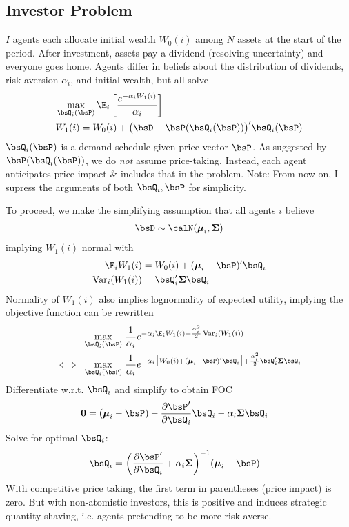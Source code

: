 \documentclass[12pt]{article}
\theoremstyle{plain}
\theoremstyle{definition}
\theoremstyle{remark}
\newcommand{\bsmu}{\boldsymbol{\mu}}
\newcommand{\bsSigma}{\boldsymbol{\Sigma}}
\renewcommand{\bso}{\boldsymbol{0}}
\newcommand{\Var}{\operatorname{Var}}
\begin{document}
\begin{multicols*}{2}
\subsection{Investor Problem}

$I$ agents each allocate initial wealth $W_0(i)$ among $N$ assets at the
start of the period. After investment, assets pay a dividend (resolving
uncertainty) and everyone goes home.  Agents differ in beliefs about the
distribution of dividends, risk aversion $\alpha_i$, and initial wealth,
but all solve
\begin{align*}
  &\max_{\bsQ_i(\bsP)}
  \E_i\left[
    \frac{e^{-\alpha_i W_1(i)}}{\alpha_i}
  \right]
  \\
  &
  W_1(i) = W_0(i) + \big(\bsD-\bsP(\bsQ_i(\bsP))\big)'\bsQ_i(\bsP)
\end{align*}
$\bsQ_i(\bsP)$ is a demand schedule given price vector $\bsP$.  As
suggested by $\bsP(\bsQ_i(\bsP))$, we do \emph{not} assume price-taking.
Instead, each agent anticipates price impact \& includes that in
the problem.
Note: From now on, I supress the arguments of both $\bsQ_i,\bsP$ for
simplicity.

To proceed, we make the simplifying assumption that all agents $i$
believe
\begin{align}
  \bsD \sim \calN(\bsmu_i,\bsSigma)
  \label{divdist}
\end{align}
implying $W_1(i)$ normal with
\begin{align*}
  \E_iW_1(i)
  &= W_0(i) + (\bsmu_i-\bsP)'\bsQ_i
  \\
  \Var_i(W_1(i))
  &= \bsQ_i'\bsSigma\bsQ_i
\end{align*}
Normality of $W_1(i)$ also implies lognormality of expected utility,
implying the objective function can be rewritten
\begin{align*}
  \max_{\bsQ_i(\bsP)}
  \;&
  \frac{1}{\alpha_i}
  e^{-\alpha_i \E_iW_1(i) + \frac{\alpha_i^2}{2}\Var_i(W_1(i))}
  \\
  \iff\;
  \max_{\bsQ_i(\bsP)}
  \;&
  \frac{1}{\alpha_i}
  e^{
    -\alpha_i\big[W_0(i) +
    (\bsmu_i-\bsP)'\bsQ_i\big]
    + \frac{\alpha_i^2}{2}\bsQ_i'\bsSigma\bsQ_i
  }
\end{align*}
Differentiate w.r.t. $\bsQ_i$ and simplify to obtain FOC
\begin{align*}
  \bso &=
  (\bsmu_i-\bsP)
  -
  \frac{\partial \bsP'}{\partial \bsQ_i}
  \bsQ_i
  - \alpha_i \bsSigma\bsQ_i
\end{align*}
Solve for optimal $\bsQ_i$:
\begin{align}
  \bsQ_i
  &=
  \bigg(
  \frac{\partial \bsP'}{\partial \bsQ_i}
  + \alpha_i \bsSigma\bigg)^{-1}
  (\bsmu_i-\bsP)
  \label{Qdemand}
\end{align}
With competitive price taking, the first term in parentheses (price
impact) is zero. But with non-atomistic investors, this is positive and
induces strategic quantity shaving, i.e. agents pretending to be more
risk averse.


\end{multicols*}
\end{document}
